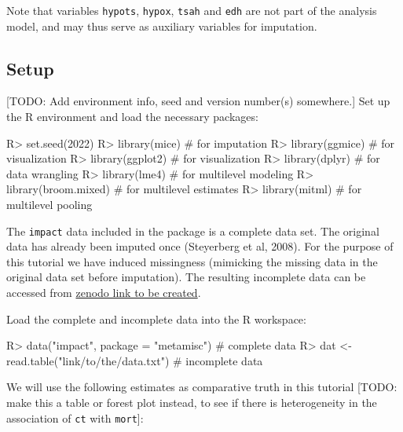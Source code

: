 \documentclass[
]{jss}
\begin{document}
Note that variables \texttt{hypots}, \texttt{hypox}, \texttt{tsah} and
\texttt{edh} are not part of the analysis model, and may thus serve as
auxiliary variables for imputation.

\hypertarget{setup}{%
\subsection{Setup}\label{setup}}

{[}TODO: Add environment info, seed and version number(s) somewhere.{]}
Set up the R environment and load the necessary packages:

\begin{CodeChunk}
\begin{CodeInput}
R> set.seed(2022)
R> library(mice)         # for imputation
R> library(ggmice)       # for visualization
R> library(ggplot2)      # for visualization
R> library(dplyr)        # for data wrangling
R> library(lme4)         # for multilevel modeling
R> library(broom.mixed)  # for multilevel estimates
R> library(mitml)        # for multilevel pooling
\end{CodeInput}
\end{CodeChunk}

The \texttt{impact} data included in the  package is a
complete data set. The original data has already been imputed once
(Steyerberg et al, 2008). For the purpose of this tutorial we have
induced missingness (mimicking the missing data in the original data set
before imputation). The resulting incomplete data can be accessed from
\href{https://zenodo.com}{zenodo link to be created}.

Load the complete and incomplete data into the R workspace:

\begin{CodeChunk}
\begin{CodeInput}
R> data("impact", package = "metamisc")      # complete data
R> dat <- read.table("link/to/the/data.txt") # incomplete data
\end{CodeInput}
\end{CodeChunk}

We will use the following estimates as comparative truth in this
tutorial {[}TODO: make this a table or forest plot instead, to see if
there is heterogeneity in the association of \texttt{ct} with
\texttt{mort}{]}:
\end{document}
